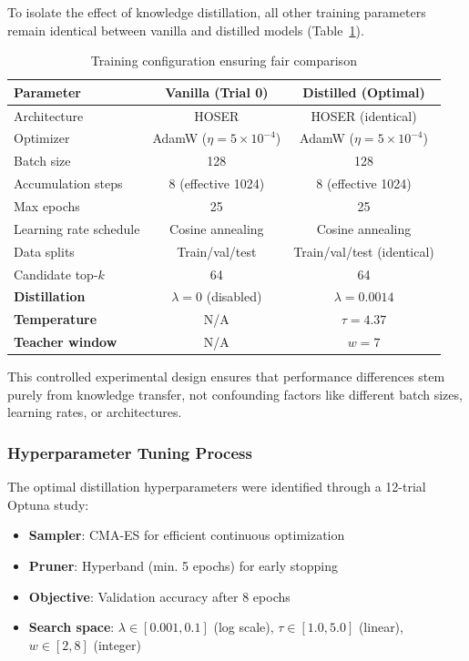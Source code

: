 To isolate the effect of knowledge distillation, all other training parameters remain identical between vanilla and distilled models (Table~\ref{tab:fair-comparison}).

\begin{table}[h]
\centering
\caption{Training configuration ensuring fair comparison}
\label{tab:fair-comparison}
\small
\begin{tabular}{lcc}
\toprule
\textbf{Parameter} & \textbf{Vanilla (Trial 0)} & \textbf{Distilled (Optimal)} \\
\midrule
Architecture & HOSER & HOSER (identical) \\
Optimizer & AdamW ($\eta = 5 \times 10^{-4}$) & AdamW ($\eta = 5 \times 10^{-4}$) \\
Batch size & 128 & 128 \\
Accumulation steps & 8 (effective 1024) & 8 (effective 1024) \\
Max epochs & 25 & 25 \\
Learning rate schedule & Cosine annealing & Cosine annealing \\
Data splits & Train/val/test & Train/val/test (identical) \\
Candidate top-$k$ & 64 & 64 \\
\midrule
\textbf{Distillation} & $\lambda = 0$ (disabled) & $\lambda = 0.0014$ \\
\textbf{Temperature} & N/A & $\tau = 4.37$ \\
\textbf{Teacher window} & N/A & $w = 7$ \\
\bottomrule
\end{tabular}
\end{table}

This controlled experimental design ensures that performance differences stem purely from knowledge transfer, not confounding factors like different batch sizes, learning rates, or architectures.

\subsubsection{Hyperparameter Tuning Process}

The optimal distillation hyperparameters were identified through a 12-trial Optuna study:

\begin{itemize}[noitemsep,topsep=0pt]
\item \textbf{Sampler}: CMA-ES for efficient continuous optimization
\item \textbf{Pruner}: Hyperband (min. 5 epochs) for early stopping
\item \textbf{Objective}: Validation accuracy after 8 epochs
\item \textbf{Search space}: $\lambda \in [0.001, 0.1]$ (log scale), $\tau \in [1.0, 5.0]$ (linear), $w \in [2, 8]$ (integer)
\end{itemize}

